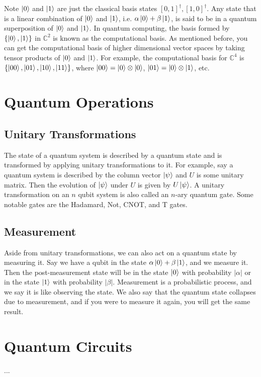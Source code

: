 \documentclass[12pt]{dalthesis}
\begin{document}
Note $\ket{0}$ and $\ket{1}$ are just the classical basis states $[0, 1]^\dag , [1, 0]^\dag $. Any state that is a linear combination of $\ket{0}$ and $\ket{1}$, i.e. $\alpha \ket{0} + \beta \ket{1}$, is said to be in a quantum superposition of $\ket{0}$ and $\ket{1}$. In quantum computing, the basis formed by $\{ \ket{0} , \ket{1} \}$ in $\mathbb{C}^2$ is known as the computational basis. As mentioned before, you can get the computational basis of higher dimensional vector spaces by taking tensor products of $\ket{0}$ and $\ket{1}$. For example, the computational basis for $\mathbb{C}^4$ is $\{ \ket{00} , \ket{01} , \ket{10} , \ket{11} \}$, where $ \ket{00} = \ket{0} \otimes \ket{0}$, $ \ket{01} = \ket{0} \otimes \ket{1}$, etc.

\section{Quantum Operations}
\subsection{Unitary Transformations}
The state of a quantum system is described by a quantum state and is transformed by applying unitary transformations to it. For example, say a quantum system is described by the column vector $\ket{\psi}$ and $U$ is some unitary matrix. Then the evolution of $\ket{\psi}$ under $U$ is given by $U \ket{\psi}$. A unitary transformation on an $n$ qubit system is also called an $n$-ary quantum gate. Some notable gates are the Hadamard, Not, CNOT, and T gates.


\subsection{Measurement}
Aside from unitary transformations, we can also act on a quantum state by measuring it. Say we have a qubit in the state $\alpha \ket{0} + \beta \ket{1}$, and we measure it. Then the post-measurement state will be in the state $\ket{0}$ with probability $|\alpha |$ or in the state $\ket{1}$ with probability $|\beta |$.  Measurement is a probabilistic process, and we say it is like observing the state. We also say that the quantum state collapses due to measurement, and if you were to measure it again, you will get the same result.

\section{Quantum Circuits}
...
\end{document}
